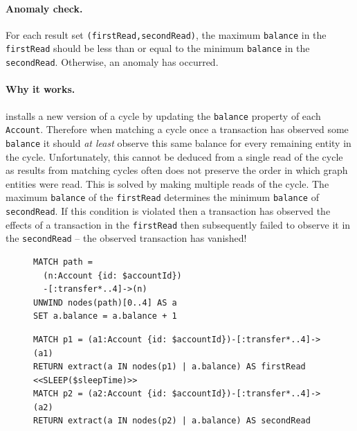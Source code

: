 \paragraph{Anomaly check.}
For each  result set \texttt{(firstRead,secondRead)}, 
the maximum \texttt{balance} in the \texttt{firstRead} should be less than or 
equal to the minimum \texttt{balance} in the \texttt{secondRead}. Otherwise, an 
 anomaly has occurred.

\paragraph{Why it works.}
 installs a new version of a cycle by updating the 
\texttt{balance} property of each \texttt{Account}. Therefore when matching a 
cycle once a transaction has observed some \texttt{balance} it should 
\emph{at least} observe this same balance for every remaining entity in the cycle.
Unfortunately, this cannot be deduced from a single read of the cycle as results
from matching cycles often does not preserve the order in which graph entities 
were read. This is solved by making multiple reads of the cycle. The maximum 
\texttt{balance} of the \texttt{firstRead} determines the minimum 
\texttt{balance} of \texttt{secondRead}. If this condition is violated then a 
transaction has observed the effects of a transaction in the \texttt{firstRead} 
then subsequently failed to observe it in the \texttt{secondRead} -- the 
observed transaction has vanished!

\begin{figure}[htb]
\centering
\begin{minipage}{0.33\linewidth}
\begin{lstlisting}[language=cypher,label=fig:otvfr1,caption=\tx{OTV/FR $T_\mathrm{W}$}.]
MATCH path = 
  (n:Account {id: $accountId})
  -[:transfer*..4]->(n)
UNWIND nodes(path)[0..4] AS a
SET a.balance = a.balance + 1
\end{lstlisting}
\end{minipage}
\quad
\begin{minipage}{0.60\linewidth}
\begin{lstlisting}[language=cypher,label=fig:otvfr2,caption=\tx{OTV/FR $T_\mathrm{R}$}.]
MATCH p1 = (a1:Account {id: $accountId})-[:transfer*..4]->(a1)
RETURN extract(a IN nodes(p1) | a.balance) AS firstRead
<<SLEEP($sleepTime)>>
MATCH p2 = (a2:Account {id: $accountId})-[:transfer*..4]->(a2)
RETURN extract(a IN nodes(p2) | a.balance) AS secondRead
\end{lstlisting}
\end{minipage}
\end{figure}


